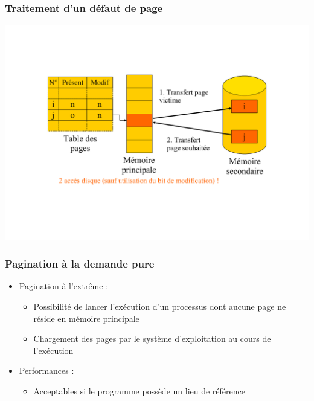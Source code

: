 \begin{frame}
\frametitle{Traitement d'un défaut de page}
\includegraphics[width=\textwidth]{../illustration/traitement_defaut_page_remplacement.pdf}
\end{frame}


\begin{frame}
\frametitle{Pagination à la demande pure}
\begin{itemize}
\item Pagination à l'extrême :
\begin{itemize}
\item Possibilité de lancer l'exécution d'un processus dont aucune page ne réside en mémoire principale
\item Chargement des pages par le système d'exploitation au cours de l'exécution
\end{itemize}
\item Performances :
\begin{itemize}
\item Acceptables si le programme possède un lieu de référence
\end{itemize}
\end{itemize}
\end{frame}



